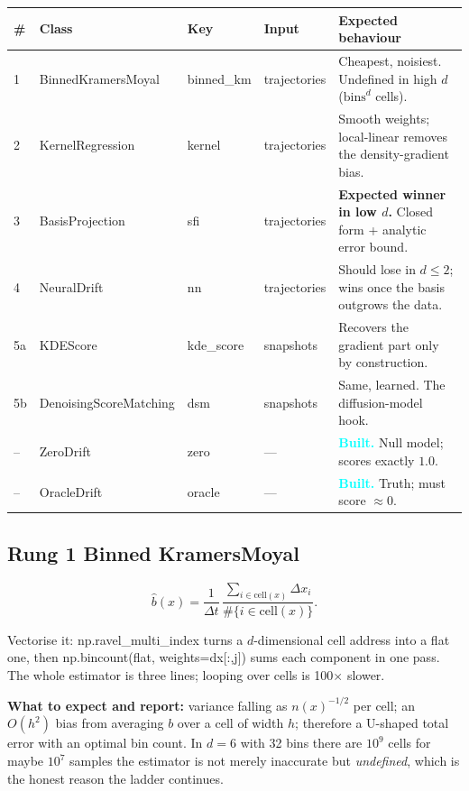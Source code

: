 \documentclass[11pt,a4paper]{article}
\newcommand{\code}[1]{{\ttfamily\small #1}}
\begin{document}
\begin{center}
\small
\begin{tabular}{@{}C{0.035\textwidth} L{0.235\textwidth} L{0.115\textwidth} L{0.105\textwidth} L{0.37\textwidth}@{}}
\toprule
\textbf{\#} & \textbf{Class} & \textbf{Key} & \textbf{Input} & \textbf{Expected behaviour} \\
 & \code{BinnedKramersMoyal} & \code{binned\_km} & trajectories &
  Cheapest, noisiest. Undefined in high $d$ ($\mathrm{bins}^d$ cells). \\
2 & \code{KernelRegression} & \code{kernel} & trajectories &
  Smooth weights; local-linear removes the density-gradient bias. \\
3 & \code{BasisProjection} & \code{sfi} & trajectories &
  \textbf{Expected winner in low $d$.} Closed form + analytic error bound. \\
4 & \code{NeuralDrift} & \code{nn} & trajectories &
  Should lose in $d\le2$; wins once the basis outgrows the data. \\
5a & \code{KDEScore} & \code{kde\_score} & snapshots &
  Recovers the gradient part only \textemdash{} by construction. \\
5b & \code{DenoisingScoreMatching} & \code{dsm} & snapshots &
  Same, learned. The diffusion-model hook. \\
\midrule
-- & \code{ZeroDrift} & \code{zero} & --- & \textcolor{aqua}{\textbf{Built.}} Null model; scores exactly $1.0$. \\
-- & \code{OracleDrift} & \code{oracle} & --- & \textcolor{aqua}{\textbf{Built.}} Truth; must score $\approx 0$. \\
\bottomrule
\end{tabular}
\end{center}

\subsection{Rung 1 \textemdash{} Binned Kramers\textendash{}Moyal}

\[
  \hat b(x) = \frac{1}{\Delta t}\,
  \frac{\sum_{i\in \mathrm{cell}(x)} \Delta x_i}{\#\{i\in \mathrm{cell}(x)\}} .
\]

Vectorise it: \code{np.ravel\_multi\_index} turns a $d$-dimensional cell address into a
flat one, then \code{np.bincount(flat, weights=dx[:,j])} sums each component in one
pass. The whole estimator is three lines; looping over cells is 100$\times$ slower.

\textbf{What to expect and report:} variance falling as $n(x)^{-1/2}$ per cell; an
$O(h^2)$ bias from averaging $b$ over a cell of width $h$; therefore a U-shaped total
error with an optimal bin count. In $d=6$ with 32 bins there are $10^9$ cells for maybe
$10^7$ samples \textemdash{} the estimator is not merely inaccurate but \emph{undefined},
which is the honest reason the ladder continues.
\end{document}
